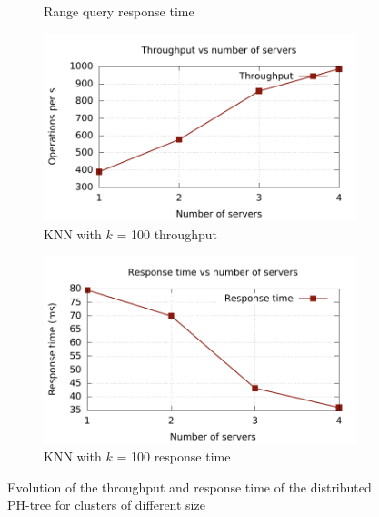 \documentclass[11pt,a4paper]{globis-book}
\begin{document}
\begin{figure}
\begin{subfigure}[b]{0.5\linewidth}
        \caption{Range query response time}
        \label{fig:exp-dist-range-rt} 
    \end{subfigure}
    \begin{subfigure}[b]{0.5\linewidth}
        \includegraphics[scale=0.5]{images/plots/knn-distributed-tp}
        \caption{KNN with $k$ = 100  throughput}
        \label{fig:exp-dist-knn-tp} 
    \end{subfigure}%
    \begin{subfigure}[b]{0.5\linewidth}
        \includegraphics[scale=0.5]{images/plots/knn-distributed-rt}
        \caption{KNN with $k$ = 100 response time}
        \label{fig:exp-dist-knn-rt} 
    \end{subfigure}
    \caption{Evolution of the throughput and response time of the distributed PH-tree for clusters of different size}
    \label{fig:exp-distributed}
\end{figure}
\end{document}
